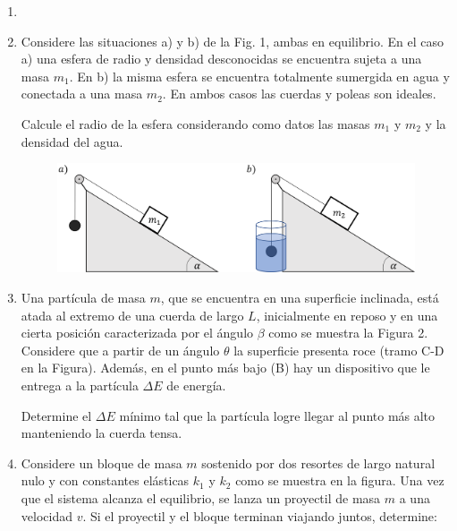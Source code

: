 \documentclass[letterpaper,11pt]{article}
\begin{document}
\vspace{-1cm}
\begin{enumerate}\setlength{\itemsep}{0.4cm}


\item[]

\item Considere las situaciones a) y b) de la Fig. 1, ambas en equilibrio. En el caso a) una esfera de radio y densidad desconocidas se encuentra sujeta a una masa $m_1$. En b) la misma esfera se encuentra totalmente sumergida en agua y conectada a una masa $m_2$. En ambos casos las cuerdas y poleas son ideales.   
\vspace{0.05cm}  
    
Calcule el radio de la esfera considerando como datos las masas $m_1$ y $m_2$ y la densidad del agua.
    
    \begin{figure}[H]
        \centering
        \includegraphics[width=0.7\linewidth]{2022-1/img/auxCrec2/esfera.png}
    \end{figure}

\item Una partícula de masa $m$, que se encuentra en una superficie inclinada, está atada al extremo de una cuerda de largo $L$, inicialmente en reposo y en una cierta posición caracterizada por el ángulo $\beta$ como se muestra la Figura 2. Considere que a partir de un ángulo $\theta$ la superficie presenta roce (tramo C-D en la Figura). Además, en el punto más bajo (B) hay un dispositivo que le entrega a la partícula $\Delta E$ de energía.

Determine el $\Delta E$ mínimo tal que la partícula logre llegar al punto más alto manteniendo la cuerda tensa.

\item Considere un bloque de masa $m$ sostenido por dos resortes de largo natural nulo y con constantes elásticas $k_1$ y $k_2$ como se muestra en la figura. Una vez que el sistema alcanza el equilibrio, se lanza un proyectil de masa $m$ a una velocidad $v$. Si el proyectil y el bloque terminan viajando juntos, determine:


\end{enumerate}
\end{document}
